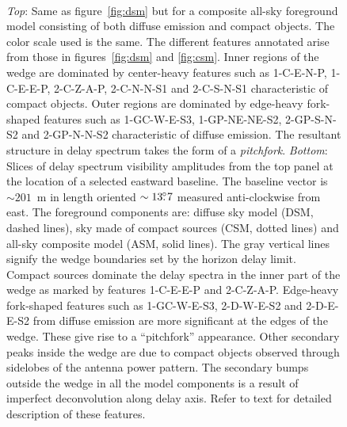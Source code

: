 \documentclass[preprint2,iop,numberedappendix]{emulateapj}
\begin{document}
\begin{figure}[htp]
\\
\caption{{\it Top}: Same as figure~\ref{fig:dsm} but for a composite all-sky foreground model consisting of both diffuse emission and compact objects. The color scale used is the same. The different features annotated arise from those in figures~\ref{fig:dsm} and \ref{fig:csm}. Inner regions of the wedge are dominated by center-heavy features such as 1-C-E-N-P, 1-C-E-E-P, 2-C-Z-A-P, 2-C-N-N-S1 and 2-C-S-N-S1 characteristic of compact objects. Outer regions are dominated by edge-heavy fork-shaped features such as 1-GC-W-E-S3, 1-GP-NE-NE-S2, 2-GP-S-N-S2 and 2-GP-N-N-S2 characteristic of diffuse emission. The resultant structure in delay spectrum takes the form of a {\it pitchfork}. {\it Bottom}: Slices of delay spectrum visibility amplitudes from the top panel at the location of a selected eastward baseline. The baseline vector is $\sim 201$~m in length oriented $\sim 13\mbox{$.\!\!^\circ$} 7$ measured anti-clockwise from east. The foreground components are: diffuse sky model (DSM, dashed lines), sky made of compact sources (CSM, dotted lines) and all-sky composite model (ASM, solid lines). The gray vertical lines signify the wedge boundaries set by the horizon delay limit. Compact sources dominate the delay spectra in the inner part of the wedge as marked by features 1-C-E-E-P and 2-C-Z-A-P. Edge-heavy fork-shaped features such as 1-GC-W-E-S3, 2-D-W-E-S2 and 2-D-E-E-S2 from diffuse emission are more significant at the edges of the wedge. These give rise to a ``pitchfork'' appearance. Other secondary peaks inside the wedge are due to compact objects observed through sidelobes of the antenna power pattern. The secondary bumps outside the wedge in all the model components is a result of imperfect deconvolution along delay axis. Refer to text for detailed description of these features.}
\label{fig:asm}
\end{figure}
\end{document}
